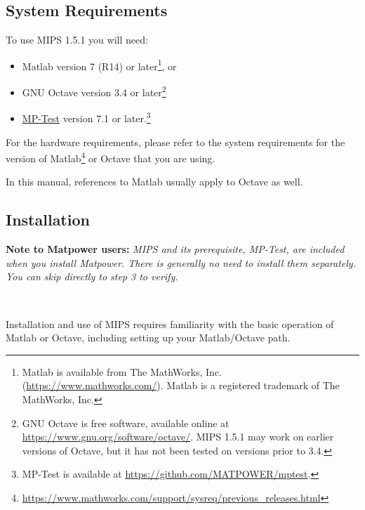 \documentclass[12pt]{article}
\newcommand{\matlab}[0]{{\sc Matlab}}
\newcommand{\matpower}[0]{{\sc Matpower}}
\newcommand{\mptest}[0]{{MP-Test}}
\newcommand{\mptesturl}[0]{https://github.com/MATPOWER/mptest}
\newcommand{\mptestlink}[0]{\href{\mptesturl}{\mptest{}}}
\newcommand{\mips}[0]{{MIPS}}
\newcommand{\mipsver}[0]{1.5.1}
\numberwithin{equation}{section}
\numberwithin{table}{section}
\numberwithin{figure}{section}
\begin{document}
\subsection{System Requirements}
\label{sec:sysreq}
To use \mips{} \mipsver{} you will need:
\begin{itemize}
\item \matlab{}\textsuperscript{\tiny \textregistered} version 7 (R14) or later\footnote{\matlab{} is available from The MathWorks, Inc. (\url{https://www.mathworks.com/}). \matlab{} is a registered trademark of The MathWorks, Inc.}, or
\item GNU Octave version 3.4 or later\footnote{GNU Octave \cite{octave} is free software, available online at \url{https://www.gnu.org/software/octave/}. \mips{} \mipsver{} may work on earlier versions of Octave, but it has not been tested on versions prior to 3.4.}
\item \mptestlink{} version 7.1 or later.\footnote{\mptest{} is available at \url{\mptesturl}.}
\end{itemize}

For the hardware requirements, please refer to the system requirements for the version of \matlab{}\footnote{\url{https://www.mathworks.com/support/sysreq/previous_releases.html}} or Octave that you are using.

In this manual, references to \matlab{} usually apply to Octave as well.

\subsection{Installation}
\label{sec:installation}

{\bf Note to \matpower{} users:} \emph{\mips{} and its prerequisite, \mptest{}, are included when you install \matpower{}. There is generally no need to install them separately. You can skip directly to step 3 to verify.}

~

Installation and use of \mips{} requires familiarity with the basic operation of \matlab{} or Octave, including setting up your \matlab{}/Octave path.
\end{document}
